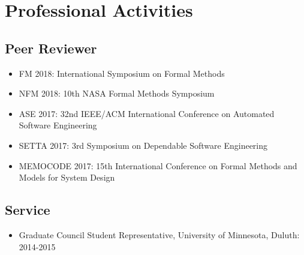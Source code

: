 \documentclass[11pt,a4paper,sans]{moderncv}        %
\begin{document}
\section{Professional Activities}
\subsection{\textbf{Peer Reviewer}}
\begin{itemize}
\item FM 2018: International Symposium on Formal Methods
\item NFM 2018: 10th NASA Formal Methods Symposium
\item ASE 2017: 32nd IEEE/ACM International Conference on Automated Software Engineering
\item SETTA 2017: 3rd Symposium on Dependable Software Engineering
\item MEMOCODE 2017: 15th International Conference on Formal Methods and Models for System Design
\end{itemize}
\vspace{0.1in}
\subsection{\textbf{Service}}
\begin{itemize}
\item  Graduate Council Student Representative, University of Minnesota, Duluth: 2014-2015
\end{itemize}
\end{document}
